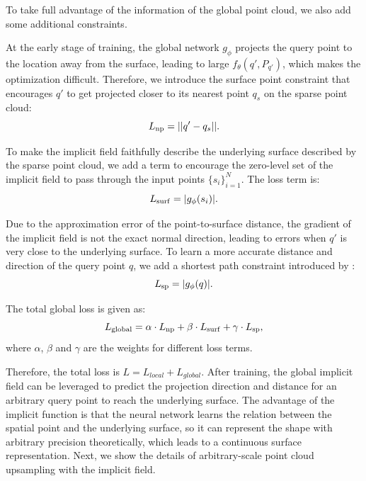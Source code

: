 \documentclass[letterpaper]{article} %
\begin{document}
To take full advantage of the information of the global point cloud, we also add some additional constraints.

At the early stage of training, the global network $g_{\phi}$ projects the query point to the location away from the surface, leading to large $f_{\theta}(q', P_{q'})$, which makes the optimization difficult. Therefore, we introduce the surface point constraint that encourages $q'$ to get projected closer to its nearest point $q_s$ on the sparse point cloud:
\begin{equation}
\label{eq:np_loss}
L_{\rm{np}} = ||q'-q_s||.
\end{equation}

To make the implicit field faithfully describe the underlying surface described by the sparse point cloud, we add a term to encourage the zero-level set of the implicit field to pass through the input points $\{s_i\}_{i=1}^N$. The loss term is:
\begin{equation}
\label{eq:np_surf}
L_{\rm{surf}} = |g_\phi(s_i)|.
\end{equation}

Due to the approximation error of the point-to-surface distance, the gradient of the implicit field is not the exact normal direction, leading to errors when $q'$ is very close to the underlying surface. To learn a more accurate distance and direction of the query point $q$, we add a shortest path constraint introduced by \cite{ma2022reconstructing}:
\begin{equation}
\label{eq:sp_loss}
L_{\rm{sp}} = |g_\phi(q)|.
\end{equation}

The total global loss is given as:
\begin{equation}
\label{eq:global_loss}
L_{\rm{global}} = \alpha \cdot L_{\rm{np}} + \beta \cdot L_{\rm{surf}} + \gamma \cdot L_{\rm{sp}},
\end{equation}
where $\alpha$, $\beta$ and $\gamma$ are the weights for different loss terms.

Therefore, the total loss is $L=L_{local}+L_{global}$. After training, the global implicit field can be leveraged to predict the projection direction and distance for an arbitrary query point to reach the underlying surface. The advantage of the implicit function is that the neural network learns the relation between the spatial point and the underlying surface, so it can represent the shape with arbitrary precision theoretically, which leads to a continuous surface representation. Next, we show the details of arbitrary-scale point cloud upsampling with the implicit field.
\end{document}
